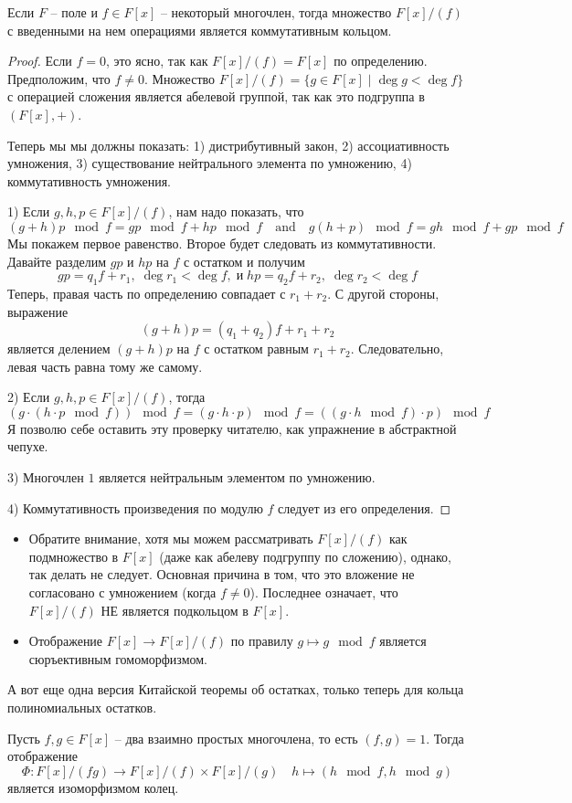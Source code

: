 \begin{claim}
Если $F$ -- поле и $f\in F[x]$ -- некоторый многочлен, тогда множество $F[x]/(f)$ с введенными на нем операциями является коммутативным кольцом.
\end{claim}
\begin{proof}
Если $f = 0$, это ясно, так как $F[x]/(f) = F[x]$ по определению.
Предположим, что $f \neq 0$.
Множество $F[x]/(f) = \{g\in F[x]\mid \deg g < \deg f\}$ с операцией сложения является абелевой группой, так как это подгруппа в $(F[x], +)$.

Теперь мы мы должны показать: 1) дистрибутивный закон, 2) ассоциативность умножения, 3) существование нейтрального элемента по умножению, 4) коммутативность умножения.

1) Если $g,h,p\in F[x]/(f)$, нам надо показать, что
\[
(g+h)p\!\!\mod{f} = gp\!\!\mod{f} + hp\!\!\mod{f}\quad\text{and}\quad
g(h+p)\!\!\mod{f} = gh\!\!\mod{f} + gp\!\!\mod{f}
\]
Мы покажем первое равенство.
Второе будет следовать из коммутативности.
Давайте разделим $gp$ и $hp$ на $f$ с остатком и получим
\[
gp = q_1 f + r_1,\;\deg r_1 < \deg f,\;\text{и}\;hp = q_2 f + r_2,\;\deg r_2 < \deg f
\]
Теперь, правая часть по определению совпадает с $r_1 + r_2$.
С другой стороны, выражение
\[
(g+h)p = (q_1 + q_2)f + r_1 + r_2
\]
является делением $(g+h)p$ на $f$ с остатком равным $r_1 + r_2$.
Следовательно, левая часть равна тому же самому.

2) Если $g,h,p\in F[x]/(f)$, тогда 
\[
(g\cdot  (h\cdot  p\!\!\mod{f}))\!\!\mod{f}= (g\cdot  h\cdot  p)\!\!\mod{f} = ((g \cdot h\!\!\mod{f}) \cdot p)\!\!\mod{f}
\]
Я позволю себе оставить эту проверку читателю, как упражнение в абстрактной чепухе.

3) Многочлен $1$ является нейтральным элементом по умножению.

4) Коммутативность произведения по модулю $f$ следует из его определения.
\end{proof}

\begin{remarks}
\begin{itemize}
\item Обратите внимание, хотя мы можем рассматривать  $F[x]/(f)$ как подмножество в $F[x]$ (даже как абелеву подгруппу по сложению), однако, так делать не следует.
Основная причина в том, что это вложение не согласовано с умножением (когда $f \neq 0$).
Последнее означает, что $F[x]/(f)$ НЕ является подкольцом в $F[x]$.

\item Отображение $F[x]\to F[x]/(f)$ по правилу $g\mapsto g\!\!\mod{f}$ является сюръективным гомоморфизмом.
\end{itemize}
\end{remarks}

А вот еще одна версия Китайской теоремы об остатках, только теперь для кольца полиномиальных остатков.

\begin{claim}
Пусть $f, g\in F[x]$ -- два взаимно простых многочлена, то есть $(f, g) = 1$.
Тогда отображение
\[
\Phi\colon F[x]/(fg) \to F[x]/(f)\times F[x]/(g)\quad h \mapsto (h\!\!\mod{f},h\!\!\mod{g})
\]
является изоморфизмом колец.
\end{claim}
